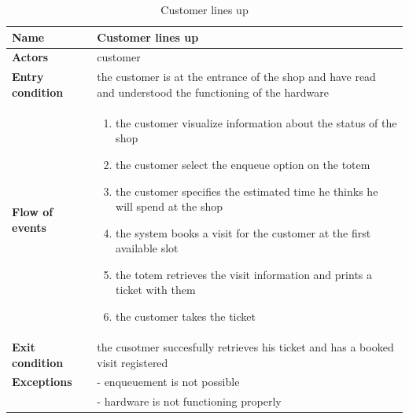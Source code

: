 \begin{table}[h!]
    \centering
    \begin{tabular}{@{}P{0.2\textwidth}P{0.70\textwidth}@{}}
        \toprule
        \textbf{Name}                 & Customer lines up\\
        \midrule
        \textbf{Actors}               & customer\\
        \textbf{Entry condition}      & the customer is at the entrance of the shop and have read and understood the functioning of the hardware\\
        \textbf{Flow of events}       & 
        \begin{enumerate}[nolistsep, leftmargin=*]
            \item the customer visualize information about the status of the shop
            \item the customer select the enqueue option on the totem
            \item the customer specifies the estimated time he thinks he will spend at the shop
            \item the system books a visit for the customer at the first available slot
            \item the totem retrieves the visit information and prints a ticket with them
            \item the customer takes the ticket
        \end{enumerate} \\
        \textbf{Exit condition}       & the cusotmer succesfully retrieves his ticket and has a booked visit registered\\
        \textbf{Exceptions}           
        & - enqueuement is not possible\\
        & - hardware is not functioning properly\\
        \bottomrule
    \end{tabular}
\caption{Customer lines up}
\label{table:customerlinesup}
\end{table}

